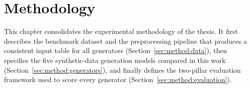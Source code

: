 
\chapter{Methodology}
\label{ch:methodology}

This chapter consolidates the experimental methodology of the thesis. It
first describes the benchmark dataset and the preprocessing pipeline that
produces a consistent input table for all generators
(Section~\ref{sec:method:data}), then specifies the five synthetic-data
generation models compared in this work
(Section~\ref{sec:method:generators}), and finally defines the two-pillar
evaluation framework used to score every generator
(Section~\ref{sec:method:evaluation}).







\cleardoublepage
